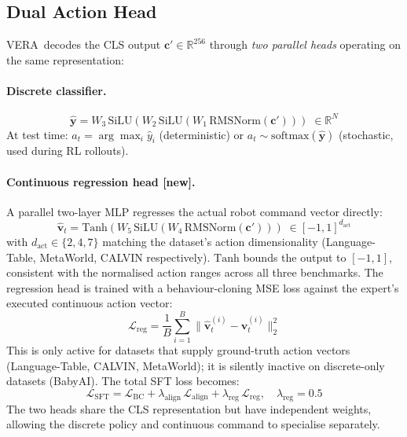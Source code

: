 \documentclass{article}
\newcommand{\modelname}{\textsc{VERA}\xspace}
\newcommand{\NEW}{\textcolor{NewOrange}{\textbf{[new]}}\xspace}
\begin{document}
\subsection{Dual Action Head}

\modelname\ decodes the CLS output $\mathbf{c}'\!\in\!\mathbb{R}^{256}$ through
\emph{two parallel heads} operating on the same representation:

\paragraph{Discrete classifier.}
\begin{equation}
  \hat{\mathbf{y}}
  = W_3\,\mathrm{SiLU}(W_2\,\mathrm{SiLU}(W_1\,\mathrm{RMSNorm}(\mathbf{c}')))
  \;\in\mathbb{R}^N
  \label{eq:head}
\end{equation}
At test time: $a_t = \arg\max_i\hat{y}_i$ (deterministic) or
$a_t\sim\mathrm{softmax}(\hat{\mathbf{y}})$ (stochastic, used during RL rollouts).

\paragraph{Continuous regression head \NEW.}
A parallel two-layer MLP regresses the actual robot command vector directly:
\begin{equation}
  \hat{\mathbf{v}}_t
  = \mathrm{Tanh}\!\left(
      W_5\,\mathrm{SiLU}(W_4\,\mathrm{RMSNorm}(\mathbf{c}'))
    \right)
  \;\in[-1,1]^{d_{\mathrm{act}}}
  \label{eq:reg_head}
\end{equation}
with $d_{\mathrm{act}}\!\in\!\{2,4,7\}$ matching the dataset's action
dimensionality (Language-Table, MetaWorld, CALVIN respectively).
$\mathrm{Tanh}$ bounds the output to $[-1,1]$, consistent with the
normalised action ranges across all three benchmarks.
The regression head is trained with a behaviour-cloning MSE loss against the
expert's executed continuous action vector:
\begin{equation}
  \mathcal{L}_{\mathrm{reg}}
  = \frac{1}{B}\sum_{i=1}^{B}\|\hat{\mathbf{v}}_t^{(i)} - \mathbf{v}_t^{(i)}\|_2^2
  \label{eq:reg_loss}
\end{equation}
This is only active for datasets that supply ground-truth action vectors
(Language-Table, CALVIN, MetaWorld); it is silently inactive on
discrete-only datasets (BabyAI).
The total SFT loss becomes:
\begin{equation}
  \mathcal{L}_{\mathrm{SFT}}
  = \mathcal{L}_{\mathrm{BC}}
  + \lambda_{\mathrm{align}}\,\mathcal{L}_{\mathrm{align}}
  + \lambda_{\mathrm{reg}}\,\mathcal{L}_{\mathrm{reg}},
  \quad \lambda_{\mathrm{reg}} = 0.5
  \label{eq:sft_total}
\end{equation}
The two heads share the CLS representation but have independent weights,
allowing the discrete policy and continuous command to specialise separately.
\end{document}
